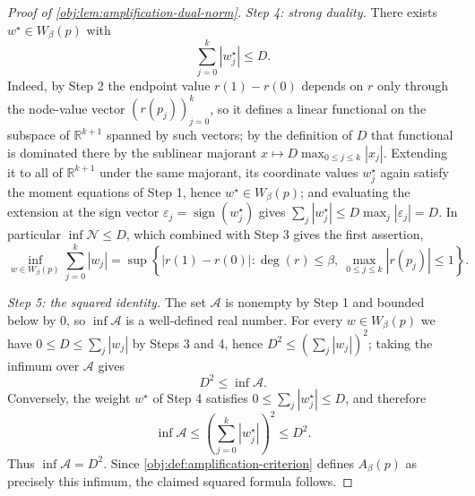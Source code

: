 \begin{proof}[Proof of \cref{obj:lem:amplification-dual-norm}]
\emph{Step 4: strong duality.}
There exists \(w^\star\in W_\beta(p)\) with
\[
\sum_{j=0}^k |w^\star_j|\le D .
\]
Indeed, by Step 2 the endpoint value \(r(1)-r(0)\) depends on \(r\) only through the node-value vector \(\left(r(p_j)\right)_{j=0}^k\), so it defines a linear functional on the subspace of \(\mathbb R^{k+1}\) spanned by such vectors; by the definition of \(D\) that functional is dominated there by the sublinear majorant \(x\mapsto D\max_{0\le j\le k}|x_j|\). Extending it to all of \(\mathbb R^{k+1}\) under the same majorant, its coordinate values \(w^\star_j\) again satisfy the moment equations of Step 1, hence \(w^\star\in W_\beta(p)\); and evaluating the extension at the sign vector \(\varepsilon_j=\operatorname{sign}(w^\star_j)\) gives \(\sum_j|w^\star_j|\le D\max_j|\varepsilon_j|=D\). %
In particular \(\inf\mathcal N\le D\), which combined with Step 3 gives the first assertion,
\[
\inf_{w\in W_\beta(p)}\sum_{j=0}^k |w_j|
=
\sup\left\{
|r(1)-r(0)|:
\deg(r)\le\beta,\ \max_{0\le j\le k}|r(p_j)|\le1
\right\}.
\] %

\emph{Step 5: the squared identity.}
The set \(\mathcal A\) is nonempty by Step 1 and bounded below by \(0\), so \(\inf\mathcal A\) is a well-defined real number.
For every \(w\in W_\beta(p)\) we have \(0\le D\le \sum_j|w_j|\) by Steps 3 and 4, hence \(D^2\le\left(\sum_j|w_j|\right)^2\); taking the infimum over \(\mathcal A\) gives
\[
D^2\le\inf\mathcal A .
\] %
Conversely, the weight \(w^\star\) of Step 4 satisfies \(0\le\sum_j|w^\star_j|\le D\), and therefore
\[
\inf\mathcal A\le \left(\sum_{j=0}^k|w^\star_j|\right)^2\le D^2 .
\] %
Thus \(\inf\mathcal A=D^2\). Since \cref{obj:def:amplification-criterion} defines \(A_\beta(p)\) as precisely this infimum, the claimed squared formula follows. %
\end{proof}

